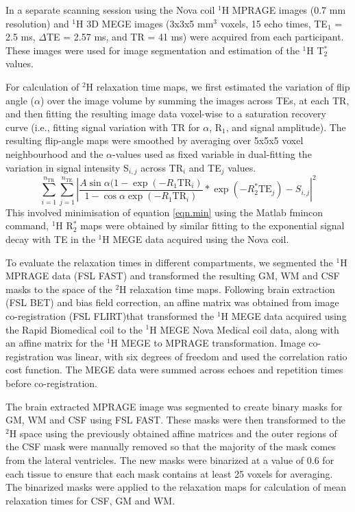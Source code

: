 \documentclass[class=article, crop=false]{standalone}
\begin{document}
In a separate scanning session using the Nova coil $^1$H  MPRAGE images (0.7 mm resolution) and $^1$H 3D MEGE images (3x3x5 mm$^3$ voxels, 15 echo times, TE$_1$ = 2.5 ms, $\Delta$TE = 2.57 ms, and TR = 41 ms) were acquired from each participant. These images were used for image segmentation and estimation of the $^1$H T$_2^*$ values. 

For calculation of $^2$H relaxation time maps, we first estimated the variation of flip angle ($\alpha$) over the image volume by summing the images across TEs, at each TR, and then fitting the resulting image data voxel-wise to a saturation recovery curve (i.e., fitting signal variation with TR for $\alpha$, R$_1$, and signal amplitude). The resulting flip-angle maps were smoothed by averaging over 5x5x5 voxel neighbourhood and the $\alpha$-values used as fixed variable in dual-fitting the variation in signal intensity S$_{i,j}$ across TR$_i$ and TE$_j$  values. 
\begin{equation}
     \sum_{i=1}^{n_{\text{TR}}}\sum_{j=1}^{n_{\text{TE}}}\left|\frac{A\sin{\alpha}(1-\exp(-R_1 \text{TR}_i)}{1-\cos{\alpha}\exp(-R_1 \text{TR}_i)}*\exp(-R_2^*\text{TE}_j) - S_{i,j}\right|^2
     \label{eqn.min}
\end{equation}
This involved minimisation of equation \ref{eqn.min} using the Matlab fmincon command, $^1$H R$_2^*$ maps were obtained by similar fitting to the exponential signal decay with TE in the $^1$H MEGE data acquired using the Nova coil.

To evaluate the relaxation times in different compartments, we segmented the $^1$H MPRAGE data (FSL FAST\cite{Zhang2001SegmentationAlgorithm}) and transformed the resulting GM, WM and CSF masks to the space of the $^2$H relaxation time maps. Following brain extraction (FSL BET\cite{Smith2002FastExtraction}) and bias field correction, an affine matrix was obtained from image co-registration (FSL FLIRT\cite{Jenkinson2001AImages,Jenkinson2002ImprovedImages})that transformed the $^1$H MEGE data acquired using the Rapid Biomedical coil to the $^1$H MEGE Nova Medical coil data, along with an affine matrix for the $^1$H MEGE to MPRAGE transformation. Image co-registration was linear, with six degrees of freedom and used the correlation ratio cost function. The MEGE data were summed across echoes and repetition times before co-registration.

The brain extracted MPRAGE image was segmented to create binary masks for GM, WM and CSF using FSL FAST\cite{Zhang2001SegmentationAlgorithm}. These masks were then transformed to the $^2$H space using the previously obtained affine matrices and the outer regions of the CSF mask were manually removed so that the majority of the mask comes from the lateral ventricles. The new masks were binarized at a value of 0.6 for each tissue to ensure that each mask contains at least 25 voxels for averaging. The binarized masks were applied to the relaxation maps for calculation of mean relaxation times for CSF, GM and WM.
\end{document}
